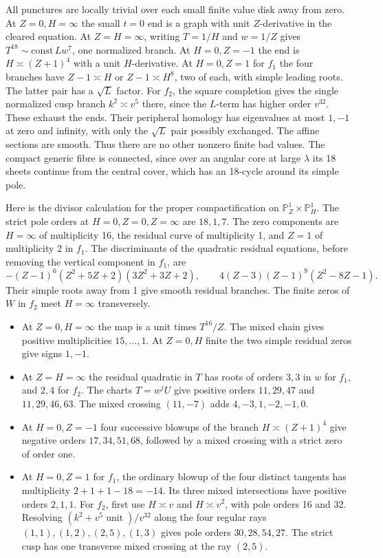 \documentclass[11pt]{article}
\begin{document}
All punctures are locally trivial over each small finite
value disk away from zero. At \(Z=0,H=\infty\) the small
\(t=0\) end is a graph with unit \(Z\)-derivative in the
cleared equation. At \(Z=H=\infty\), writing \(T=1/H\)
and \(w=1/Z\) gives \(T^{18}\sim\mathrm{const}\,L w^7\),
one normalized branch. At \(H=0,Z=-1\) the end is
\(H\asymp(Z+1)^4\) with a unit \(H\)-derivative.
At \(H=0,Z=1\) for \(f_1\) the four branches have
\(Z-1\asymp H\) or \(Z-1\asymp H^8\), two of each,
with simple leading roots. The latter pair has a
\(\sqrt L\) factor. For \(f_2\), the square completion
gives the single normalized cusp branch
\(k^2\asymp v^5\) there, since the \(L\)-term has
higher order \(v^{32}\). These exhaust the ends.
Their peripheral homology has eigenvalues at most
\(1,-1\) at zero and infinity, with only the
\(\sqrt L\) pair possibly exchanged. The affine
sections are smooth. Thus there are no other nonzero
finite bad values. The compact generic fibre is
connected, since over an angular core at large
\(\lambda\) its 18 sheets continue from the central
cover, which has an 18-cycle around its simple pole.

Here is the divisor calculation for the proper
compactification on \(\mathbb P^1_Z\times\mathbb P^1_H\).
The strict pole orders at \(H=0,Z=0,Z=\infty\) are
\(18,1,7\). The zero components are \(H=\infty\)
of multiplicity 16, the residual curve of multiplicity 1,
and \(Z=1\) of multiplicity 2 in \(f_1\).
The discriminants of the quadratic residual equations,
before removing the vertical component in \(f_1\), are
\[
 -(Z-1)^6(Z^2+5Z+2)(3Z^2+3Z+2),\qquad
 4(Z-3)(Z-1)^9(Z^2-8Z-1).
\]
Their simple roots away from 1 give smooth residual
branches. The finite zeros of \(W\) in \(f_2\) meet
\(H=\infty\) transversely.

\begin{itemize}
\item At \(Z=0,H=\infty\) the map is a unit times
\(T^{16}/Z\). The mixed chain gives positive
multiplicities \(15,\ldots,1\). At \(Z=0,H\) finite
the two simple residual zeros give signs \(1,-1\).
\item At \(Z=H=\infty\) the residual quadratic in \(T\)
has roots of orders \(3,3\) in \(w\) for \(f_1\),
and \(2,4\) for \(f_2\). The charts \(T=w^jU\)
give positive orders \(11,29,47\) and \(11,29,46,63\).
The mixed crossing \((11,-7)\) adds
\(4,-3,1,-2,-1,0\).
\item At \(H=0,Z=-1\) four successive blowups of the
branch \(H\asymp(Z+1)^4\) give negative orders
\(17,34,51,68\), followed by a mixed crossing with a
strict zero of order one.
\item At \(H=0,Z=1\) for \(f_1\), the ordinary blowup
of the four distinct tangents has multiplicity
\(2+1+1-18=-14\). Its three mixed intersections
have positive orders \(2,1,1\). For \(f_2\), first
use \(H\asymp v\) and \(H\asymp v^2\), with pole
orders 16 and 32. Resolving
\((k^2+v^5\operatorname{unit})/v^{32}\) along the
four regular rays \((1,1),(1,2),(2,5),(1,3)\)
gives pole orders \(30,28,54,27\).
The strict cusp has one transverse mixed crossing
at the ray \((2,5)\).
\end{itemize}
\end{document}
